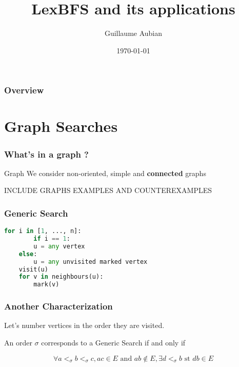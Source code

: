 \documentclass{beamer}
\begin{document}
\title{LexBFS and its applications}  
\author{Guillaume Aubian}
\date{\today} 


\begin{frame}
\titlepage
\end{frame}

\begin{frame}\frametitle{Overview}\tableofcontents
\end{frame} 


\section{Graph Searches} 
\begin{frame}\frametitle{What's in a graph ?}
    \begin{block}{Graph}
	We consider non-oriented, simple and \textbf{connected} graphs
    \end{block}
    INCLUDE GRAPHS EXAMPLES AND COUNTEREXAMPLES
\end{frame}

\begin{frame}[fragile]\frametitle{Generic Search}
    \begin{lstlisting}[language = Python]
    for i in [1, ..., n]:
        if i == 1:
	    u = any vertex
	else:
	    u = any unvisited marked vertex
	visit(u)
	for v in neighbours(u):
	    mark(v)
    \end{lstlisting}
\end{frame}

\begin{frame}\frametitle{Another Characterization}
    Let's number vertices in the order they are visited.
    \begin{theorem}
        An order $\sigma$ corresponds to a Generic Search if and only if
	    
	    $$\forall a <_{\sigma} b <_{\sigma} c, ac \in E\text{ and }ab \notin E, \exists d <_{\sigma} b\text{ st }db \in E$$
    \end{theorem}
    \begin{center}
    \end{center}
\end{frame}
\end{document}
